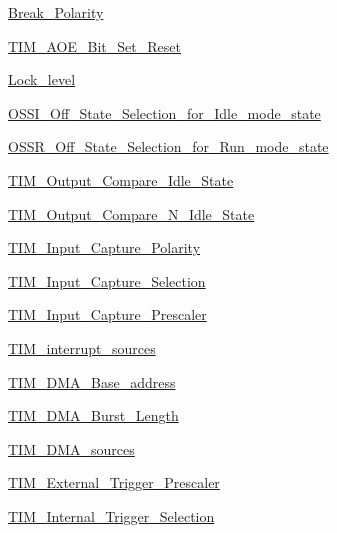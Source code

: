 \begin{DoxyCompactItemize}
\item 
\mbox{\hyperlink{group___break___polarity}{Break\+\_\+\+Polarity}}
\item 
\mbox{\hyperlink{group___t_i_m___a_o_e___bit___set___reset}{T\+I\+M\+\_\+\+A\+O\+E\+\_\+\+Bit\+\_\+\+Set\+\_\+\+Reset}}
\item 
\mbox{\hyperlink{group___lock__level}{Lock\+\_\+level}}
\item 
\mbox{\hyperlink{group___o_s_s_i___off___state___selection__for___idle__mode__state}{O\+S\+S\+I\+\_\+\+Off\+\_\+\+State\+\_\+\+Selection\+\_\+for\+\_\+\+Idle\+\_\+mode\+\_\+state}}
\item 
\mbox{\hyperlink{group___o_s_s_r___off___state___selection__for___run__mode__state}{O\+S\+S\+R\+\_\+\+Off\+\_\+\+State\+\_\+\+Selection\+\_\+for\+\_\+\+Run\+\_\+mode\+\_\+state}}
\item 
\mbox{\hyperlink{group___t_i_m___output___compare___idle___state}{T\+I\+M\+\_\+\+Output\+\_\+\+Compare\+\_\+\+Idle\+\_\+\+State}}
\item 
\mbox{\hyperlink{group___t_i_m___output___compare___n___idle___state}{T\+I\+M\+\_\+\+Output\+\_\+\+Compare\+\_\+\+N\+\_\+\+Idle\+\_\+\+State}}
\item 
\mbox{\hyperlink{group___t_i_m___input___capture___polarity}{T\+I\+M\+\_\+\+Input\+\_\+\+Capture\+\_\+\+Polarity}}
\item 
\mbox{\hyperlink{group___t_i_m___input___capture___selection}{T\+I\+M\+\_\+\+Input\+\_\+\+Capture\+\_\+\+Selection}}
\item 
\mbox{\hyperlink{group___t_i_m___input___capture___prescaler}{T\+I\+M\+\_\+\+Input\+\_\+\+Capture\+\_\+\+Prescaler}}
\item 
\mbox{\hyperlink{group___t_i_m__interrupt__sources}{T\+I\+M\+\_\+interrupt\+\_\+sources}}
\item 
\mbox{\hyperlink{group___t_i_m___d_m_a___base__address}{T\+I\+M\+\_\+\+D\+M\+A\+\_\+\+Base\+\_\+address}}
\item 
\mbox{\hyperlink{group___t_i_m___d_m_a___burst___length}{T\+I\+M\+\_\+\+D\+M\+A\+\_\+\+Burst\+\_\+\+Length}}
\item 
\mbox{\hyperlink{group___t_i_m___d_m_a__sources}{T\+I\+M\+\_\+\+D\+M\+A\+\_\+sources}}
\item 
\mbox{\hyperlink{group___t_i_m___external___trigger___prescaler}{T\+I\+M\+\_\+\+External\+\_\+\+Trigger\+\_\+\+Prescaler}}
\item 
\mbox{\hyperlink{group___t_i_m___internal___trigger___selection}{T\+I\+M\+\_\+\+Internal\+\_\+\+Trigger\+\_\+\+Selection}}

\end{DoxyCompactItemize}
